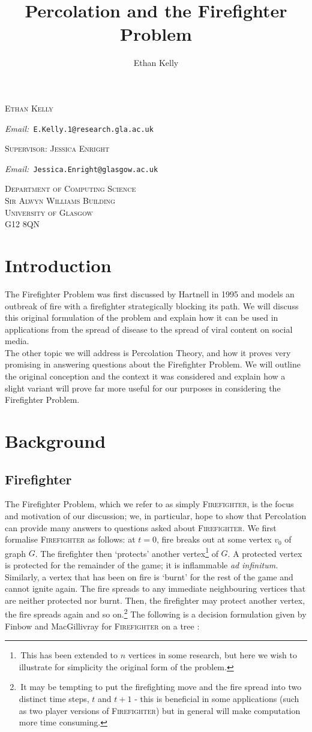 \documentclass[11pt]{amsart}
\title{Percolation and the Firefighter Problem}
\author{Ethan Kelly}
\makeatletter
\newcommand{\Addresses}{{%
  \bigskip
  \footnotesize
  \textsc{Ethan Kelly} \par\nopagebreak
  	\hspace{\parindent}\textit{Email:~}\texttt{E.Kelly.1@research.gla.ac.uk}\par\nopagebreak
	\vspace{1mm}
  \textsc{Supervisor: Jessica Enright}\par\nopagebreak
  	\hspace{\parindent}\textit{Email:~}\texttt{Jessica.Enright@glasgow.ac.uk}\par\nopagebreak
	\vspace{1mm}
	\begin{flushright}
  \textsc{Department of Computing Science\\Sir Alwyn Williams Building\\University of Glasgow\\G12 8QN}
  \end{flushright}
}}
\makeatother
\begin{document}
\maketitle
\Addresses
\section{Introduction}
\label{sec:intro}

The Firefighter Problem was first discussed by Hartnell in 1995 \cite{hartnell95} and models an outbreak of fire with a firefighter strategically blocking its path. We will discuss this original formulation of the problem and explain how it can be used in applications from the spread of disease to the spread of viral content on social media.\\

The other topic we will address is Percolation Theory, and how it proves very promising in answering questions about the Firefighter Problem. We will outline the original conception and the context it was considered and explain how a slight variant will prove far more useful for our purposes in considering the Firefighter Problem.


\section{Background}

\subsection{Firefighter}
\label{sec:fire}

The Firefighter Problem, which we refer to as simply {\scshape Firefighter}, is the focus and motivation of our discussion; we, in particular, hope to show that Percolation can provide many answers to questions asked about {\scshape Firefighter}. We first formalise {\scshape Firefighter} as follows: at $t=0$, fire breaks out at some vertex $v_0$ of graph $G$. The firefighter then `protects' another vertex\footnote{\,This has been extended to $n$ vertices in some research, but here we wish to illustrate for simplicity the original form of the problem.} of $G$. A protected vertex is protected for the remainder of the game; it is inflammable \textit{ad infinitum.} Similarly, a vertex that has been on fire is `burnt' for the rest of the game and cannot ignite again. The fire spreads to any immediate neighbouring vertices that are neither protected nor burnt. Then, the firefighter may protect another vertex, the fire spreads again and so on.\footnote{\,It may be tempting to put the firefighting move and the fire spread into two distinct time steps, $t$ and $t+1$ - this is beneficial in some applications (such as two player versions of {\scshape Firefighter}) but in general will make computation more time consuming.} The following is a decision formulation given by Finbow and MacGillivray for {\scshape Firefighter} on a tree \cite{finbow09}:
\end{document}
